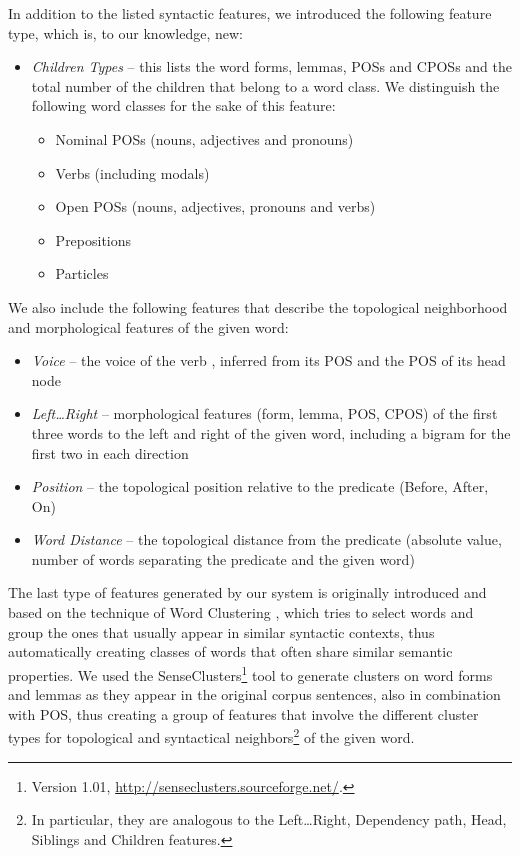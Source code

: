 \documentclass[12pt,notitlepage]{report}
\begin{document}
In addition to the listed syntactic features, we introduced the following feature type, which is, to our knowledge, new:
\begin{itemize}
    \item \emph{Children Types} -- this lists the word forms, lemmas, POSs and CPOSs and the total number of the children that belong to a word class. We distinguish the following word classes for the sake of this feature:
    \begin{itemize}
        \item Nominal POSs (nouns, adjectives and pronouns)
        \item Verbs (including modals)
        \item Open POSs (nouns, adjectives, pronouns and verbs)
        \item Prepositions
        \item Particles
    \end{itemize}
\end{itemize}

We also include the following features that describe the topological neighborhood and morphological features of the given word:
\begin{itemize}
    \item \emph{Voice} -- the voice of the verb \citep{che09}, inferred from its POS and the POS of its head node
    \item \emph{Left\dots Right} -- morphological features (form, lemma, POS, CPOS) of the first three words to the left and right of the given word, including a bigram for the first two in each direction
    \item \emph{Position} -- the topological position relative to the predicate (Before, After, On) \citep{nugues09}
    \item \emph{Word Distance} -- the topological distance from the predicate (absolute value, number of words separating the predicate and the given word) \citep{asahara09}
\end{itemize}

The last type of features generated by our system is originally introduced and based on the technique of Word Clustering \citep{pereira93}, which tries to select words and group the ones that usually appear in similar syntactic contexts, thus automatically creating classes of words that often share similar semantic properties. We used the SenseClusters\footnote{Version 1.01, \url{http://senseclusters.sourceforge.net/}.} tool \citep{kulkarni05} to generate clusters on word forms and lemmas as they appear in the original corpus sentences, also in combination with POS, thus creating a group of features that involve the different cluster types for topological and syntactical neighbors\footnote{In particular, they are analogous to the Left\dots Right, Dependency path, Head, Siblings and Children features.} of the given word.
\end{document}
